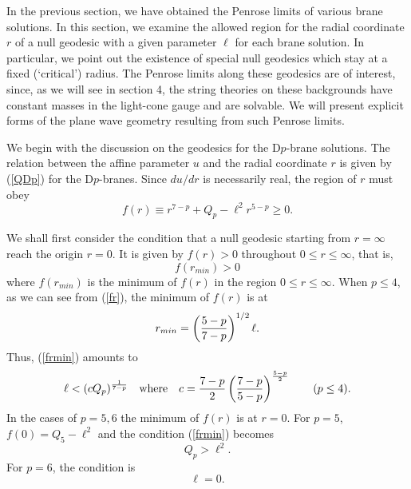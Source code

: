 \documentclass[a4paper,12pt]{article}
\begin{document}
In the previous section, we have 
obtained the Penrose limits of
various brane solutions. 
In this section, we examine the allowed region
for the radial coordinate $r$ of a null geodesic 
with a given parameter $\ell$ for each brane solution. 
In particular, we point out the existence of 
special null geodesics which stay at a 
fixed (`critical') radius. The Penrose limits
along these geodesics are of interest, 
since, as we will see in section 4, 
the string theories on these backgrounds 
have constant masses in the light-cone gauge
and are solvable. We will present explicit forms
of the plane wave geometry resulting from such
Penrose limits.



We begin with the discussion on the geodesics
for the D$p$-brane solutions.
The relation between the affine parameter $u$ 
and the radial coordinate $r$
is given by (\ref{QDp}) for the D$p$-branes. 
Since $du/dr$ is necessarily real, 
the region of $r$ must obey
\begin{equation}
f(r)\equiv r^{7-p}+Q_{p}-\ell^{2}r^{5-p}\ge 0.
\label{fr}
\end{equation}

We shall first consider the condition that a null geodesic
starting from $r=\infty$ reach the origin $r=0$.
It is given by $f(r)> 0$ throughout $0\le r\le \infty$, 
that is,
\begin{equation}
f(r_{min})>0
\label{frmin}
\end{equation}
where $f(r_{min})$ is the minimum of $f(r)$ in the
region $0\le r\le \infty$.
When $p\le 4$, as we can see from (\ref{fr}),  
the minimum of $f(r)$ is at
\begin{equation}
r_{min}=\left({5-p\over 7-p}\right)^{1/2}\ell.
\end{equation}
Thus, (\ref{frmin}) amounts to
\begin{equation}
\ell< (c Q_{p})^{1\over 7-p} \quad \mbox{where}\quad 
c={7-p\over 2}\left({7-p\over 5-p}\right)^{5-p\over 2}
\qquad (p\le4).
\label{geodcond}
\end{equation}
In the cases of $p=5,6$ the minimum of $f(r)$ is at $r=0$.
For $p=5$, $f(0)=Q_{5}-\ell^2$ and the condition (\ref{frmin})
becomes
\begin{equation}
Q_{p}> \ell^2. 
\end{equation}
For $p=6$, the condition is 
\begin{equation}
\ell=0.
\end{equation}
\end{document}
